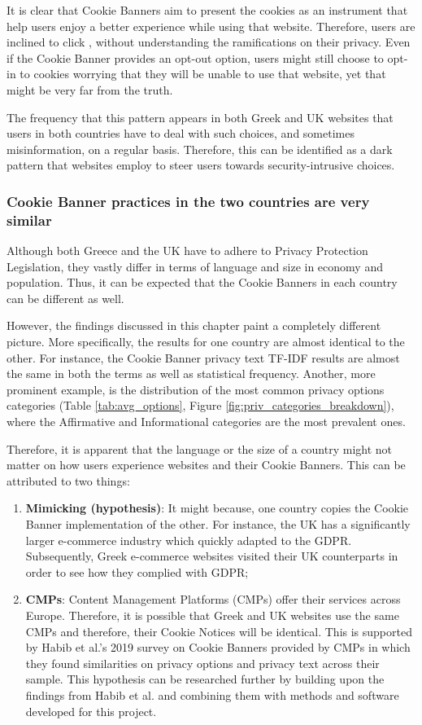 \documentclass[../main.tex]{subfiles}
\begin{document}
It is clear that Cookie Banners aim to present the cookies as an instrument that help users enjoy a better experience while using that website. Therefore, users are inclined to click , without understanding the ramifications on their privacy. Even if the Cookie Banner provides an opt-out option, users might still choose to opt-in to cookies worrying that they will be unable to use that website, yet that might be very far from the truth.

The frequency that this pattern appears in both Greek and UK websites that users in both countries have to deal with such choices, and sometimes misinformation, on a regular basis. Therefore, this can be identified as a dark pattern that websites employ to steer users towards security-intrusive choices.

\subsubsection{Cookie Banner practices in the two countries are very similar}
Although both Greece and the UK have to adhere to Privacy Protection Legislation, they vastly differ in terms of language and size in economy and population. Thus, it can be expected that the Cookie Banners in each country can be different as well.

However, the findings discussed in this chapter paint a completely different picture. More specifically, the results for one country are almost identical to the other. For instance, the Cookie Banner privacy text TF-IDF results are almost the same in both the terms as well as statistical frequency. Another, more prominent example, is the distribution of the most common privacy options categories (Table \ref{tab:avg_options}, Figure \ref{fig:priv_categories_breakdown}), where the Affirmative and Informational categories are the most prevalent ones. 

Therefore, it is apparent that the language or the size of a country might not matter on how users experience websites and their Cookie Banners. This can be attributed to two things:

\begin{enumerate}
    \item \textbf{Mimicking (hypothesis)}: It might because, one country copies the Cookie Banner implementation of the other. For instance, the UK has a significantly larger e-commerce industry which quickly adapted to the GDPR. Subsequently, Greek e-commerce websites visited their UK counterparts in order to see how they complied with GDPR;
    \item \textbf{CMPs}: Content Management Platforms (CMPs) offer their services across Europe. Therefore, it is possible that Greek and UK websites use the same CMPs and therefore, their Cookie Notices will be identical. This is supported by Habib et al.'s 2019 survey on Cookie Banners provided by CMPs in which they found similarities on privacy options and privacy text across their sample. This hypothesis can be researched further by building upon the findings from Habib et al. and combining them with methods and software developed for this project. 
\end{enumerate}
\end{document}
